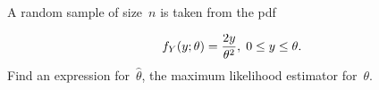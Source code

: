 \begin{problem}
  A random sample of size~$n$ is taken from the pdf

  \begin{equation}\label{eq:P06}
    f_{Y}(y;\theta) = \frac{2y}{\theta^2}, \hspace{0.1cm} 0 \leq y \leq \theta\text{.}
  \end{equation}
  Find an expression for~$\hat{\theta}$, the maximum likelihood estimator for~$\theta$.
\end{problem}

